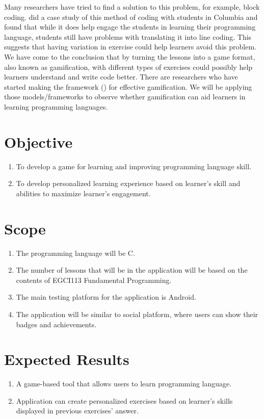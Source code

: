 Many researchers have tried to find a solution to this problem, for example, block coding. \citet{BlockCode} did a case study of this method of coding with students in Columbia and found that while it does help engage the students in learning their programming language, students still have problems with translating it into line coding. This suggests that having variation in exercise could help learners avoid this problem. We have come to the conclusion that by turning the lessons into a game format, also known as gamification, with different types of exercises could possibly help learners understand and write code better. There are researchers who have started making the framework (\citet{Design}) for effective gamification. We will be applying those models/frameworks to observe whether gamification can aid learners in learning programming languages.

\newpage

\section{Objective}
\noindent\hspace{1.5em}
\begin{enumerate}
	\item To develop a game for learning and improving programming language skill.
	\item To develop personalized learning experience based on learner's skill and abilities to maximize learner's engagement.
\end{enumerate}

\section{Scope}
\begin{enumerate}
    \item The programming language will be C.
    \item The number of lessons that will be in the application will be based on the contents of EGCI113 Fundamental Programming.
    \item The main testing platform for the application is Android.
    \item The application will be similar to social platform, where users can show their badges and achievements.
\end{enumerate}

\section{Expected Results}
\noindent\hspace{1.5em}
\begin{enumerate}
	\item A game-based tool that allows users to learn programming language.
	\item Application can create personalized exercises based on learner's skills displayed in previous exercises' answer.
\end{enumerate}

